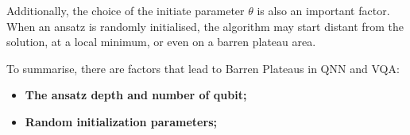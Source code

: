 Additionally, the choice of the initiate parameter $\theta$ is also an important factor. When an ansatz is randomly initialised, the algorithm may start distant from the solution, at a local minimum, or even on a barren plateau area. 

To summarise, there are factors that lead to Barren Plateaus in QNN and VQA:
\begin{itemize}
    \item \textbf{The ansatz depth and number of qubit;}
    \item \textbf{Random initialization parameters;}
\end{itemize}